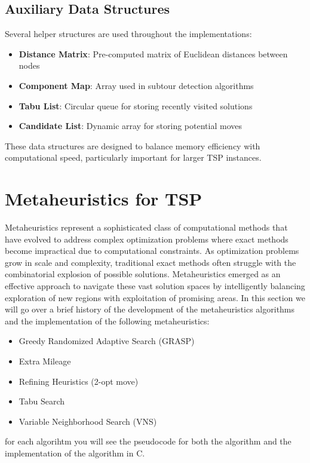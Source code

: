 \documentclass{article}
\begin{document}
\subsection{Auxiliary Data Structures}
Several helper structures are used throughout the implementations:

\begin{itemize}
	\item \textbf{Distance Matrix}: Pre-computed matrix of Euclidean distances between nodes
	\item \textbf{Component Map}: Array used in subtour detection algorithms
	\item \textbf{Tabu List}: Circular queue for storing recently visited solutions
	\item \textbf{Candidate List}: Dynamic array for storing potential moves
\end{itemize}

These data structures are designed to balance memory efficiency with computational speed, particularly important for larger TSP instances.


\newpage

\section{Metaheuristics for TSP}
Metaheuristics represent a sophisticated class of computational methods that have evolved to address complex optimization problems where exact methods become impractical due to computational constraints. 
As optimization problems grow in scale and complexity, traditional exact methods often struggle with the combinatorial explosion of possible solutions. 
Metaheuristics emerged as an effective approach to navigate these vast solution spaces by intelligently balancing exploration of new regions with exploitation of promising areas.
In this section we will go over a brief history of the development of the metaheuristics algorithms and the implementation of the following metaheuristics:
\begin{itemize}
	\item Greedy Randomized Adaptive Search (GRASP)
	\item Extra Mileage
	\item Refining Heuristics (2-opt move)
	\item Tabu Search
	\item Variable Neighborhood Search (VNS)
\end{itemize}
for each algorihtm you will see the pseudocode for both the algorithm and the implementation of the algorithm in C.
\end{document}
